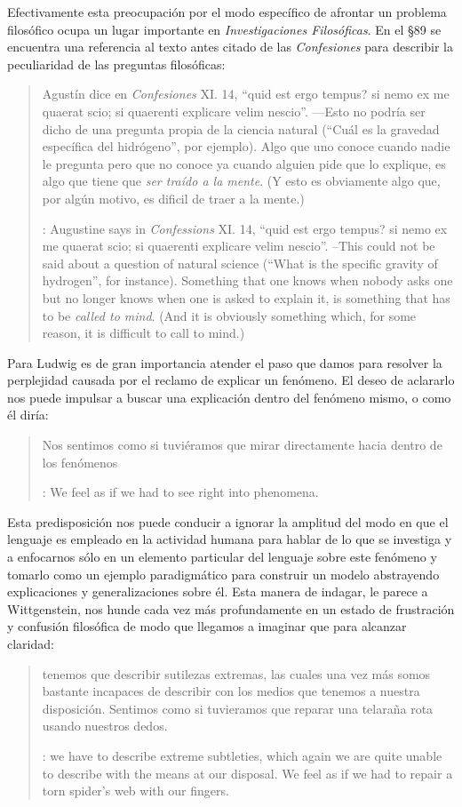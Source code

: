 Efectivamente esta preocupación por el modo específico de afrontar un problema filosófico ocupa un lugar importante en \emph{Investigaciones Filosóficas}. En el \S89 se encuentra una referencia al texto antes citado de las \emph{Confesiones} para describir la peculiaridad de las preguntas filosóficas: \blockquote[{\cite[\S89]{wittgenstein1953phiinv}}: Augustine says in \emph{Confessions} XI. 14, \enquote{quid est ergo tempus? si nemo ex me quaerat scio; si quaerenti explicare velim nescio}. --This could not be said about a question of natural science (\enquote{What is the specific gravity of hydrogen}, for instance). Something that one knows when nobody asks one but no longer knows when one is asked to explain it, is something that has to be \emph{called to mind}. (And it is obviously something which, for some reason, it is difficult to call to mind.)]{Agustín dice en \emph{Confesiones} XI. 14, \enquote{quid est ergo tempus? si nemo ex me quaerat scio; si quaerenti explicare velim nescio}. ---Esto no podría ser dicho de una pregunta propia de la ciencia natural (\enquote{Cuál es la gravedad específica del hidrógeno}, por ejemplo). Algo que uno conoce cuando nadie le pregunta pero que no conoce ya cuando alguien pide que lo explique, es algo que tiene que \emph{ser traído a la mente}. (Y esto es obviamente algo que, por algún motivo, es dificil de traer a la mente.)} Para Ludwig es de gran importancia atender el paso que damos para resolver la perplejidad causada por el reclamo de explicar un fenómeno. El deseo de aclararlo nos puede impulsar a buscar una explicación dentro del fenómeno mismo, o como él diría: \blockquote[{\cite[\S90]{wittgenstein1953phiinv}}: We feel as if we had to see right into phenomena.]{Nos sentimos como si tuviéramos que mirar directamente hacia dentro de los fenómenos}. Esta predisposición nos puede conducir a ignorar la amplitud del modo en que el lenguaje es empleado en la actividad humana para hablar de lo que se investiga y a enfocarnos sólo en un elemento particular del lenguaje sobre este fenómeno y tomarlo como un ejemplo paradigmático para construir un modelo abstrayendo explicaciones y generalizaciones sobre él. Esta manera de indagar, le parece a Wittgenstein, nos hunde cada vez más profundamente en un estado de frustración y confusión filosófica de modo que llegamos a imaginar que para alcanzar claridad: \blockquote[{\cite[\S106]{wittgenstein1953phiinv}}: we have to describe extreme subtleties, which again we are quite unable to describe with the means at our disposal. We feel as if we had to repair a torn spider's web with our fingers. ]{tenemos que describir sutilezas extremas, las cuales una vez más somos bastante incapaces de describir con los medios que tenemos a nuestra disposición. Sentimos como si tuvieramos que reparar una telaraña rota usando nuestros dedos.}


